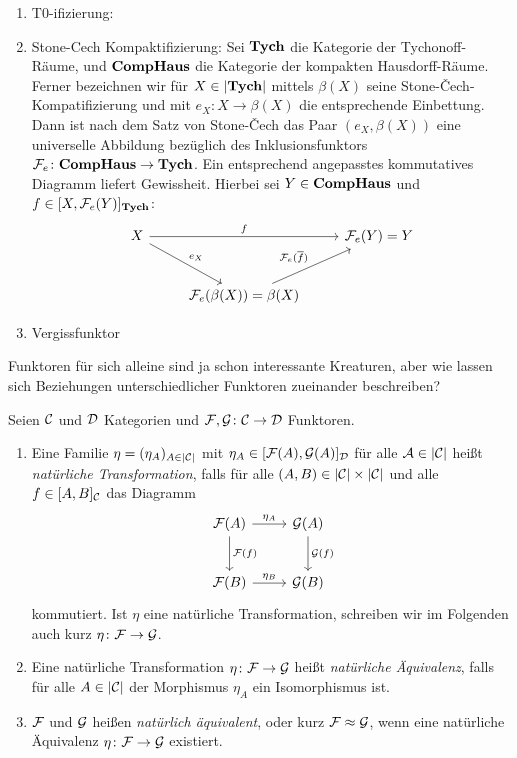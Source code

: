 \begin{ex}
  \begin{enumerate}
    \item T0-ifizierung: 
    \item Stone-Cech Kompaktifizierung: Sei $\mathbf{Tych}$ die Kategorie der Tychonoff-Räume, und $\mathbf{CompHaus}$ die Kategorie der kompakten Hausdorff-Räume.
      Ferner bezeichnen wir für $X \in |\mathbf{Tych}|$ mittels $\beta(X)$ seine Stone-\v{C}ech-Kompatifizierung und mit $e_X \colon X \to \beta(X)$ die entsprechende Einbettung. Dann ist nach dem Satz von Stone-\v{C}ech \cite[5.4.8]{bartsch} das Paar $(e_X, \beta(X))$ eine universelle Abbildung bezüglich des Inklusionsfunktors $\mathcal{F}_e \colon \mathbf{CompHaus} \to \mathbf{Tych}$.
      Ein entsprechend angepasstes kommutatives Diagramm liefert Gewissheit. Hierbei sei $Y \in \mathbf{CompHaus}$ und $f \in [X, \mathcal{F}_e(Y)]_{\mathbf{Tych}}$:
      $$
      \begin{tikzcd}[row sep=2.5em]
        X \arrow[rd,"e_X"] \arrow[rr, "f"] &&\F_e(Y) = Y \\
        &\F_e(\beta(X)) = \beta(X) \arrow[ru, "\F_e(\overline{f})"]
      \end{tikzcd}
      $$
    \item Vergissfunktor
  \end{enumerate}
\end{ex}

Funktoren für sich alleine sind ja schon interessante Kreaturen, aber wie lassen sich Beziehungen unterschiedlicher Funktoren zueinander beschreiben?

\begin{defn}
  Seien $\mathcal{C}$ und $\mathcal{D}$ Kategorien und $\mathcal{F}, \mathcal{G} \colon \mathcal{C} \to \mathcal{D}$ Funktoren.
  \begin{enumerate}[1)]
    \item Eine Familie $\eta = (\eta_A)_{A \in |\mathcal{C}|}$ mit $\eta_A \in [\mathcal{F}(A), \mathcal{G}(A)]_{\mathcal{D}}$ für alle $\mathcal{A} \in |\mathcal{C}|$ heißt \emph{natürliche Transformation}, falls für alle $(A,B) \in |\mathcal{C}| \times |\mathcal{C}|$ und alle $f \in [A,B]_{\mathcal{C}}$ das Diagramm
      $$
      \begin{tikzcd}[row sep=2.5em]
        \F(A)\arrow[r,"\eta_A"]\arrow[d,"\F(f)"] & \G(A)\arrow[d,"\G(f)"] \\
        \F(B)\arrow[r,"\eta_B"] & \G(B)
      \end{tikzcd}
      $$
      kommutiert. Ist $\eta$ eine natürliche Transformation, schreiben wir im Folgenden auch kurz $\eta \colon \mathcal{F} \to \mathcal{G}$.
    \item Eine natürliche Transformation $\eta \colon \mathcal{F} \to \mathcal{G}$ heißt \emph{natürliche Äquivalenz}, falls für alle $A \in |\mathcal{C}|$ der Morphismus $\eta_A$ ein Isomorphismus ist.
    \item $\mathcal{F}$ und $\mathcal{G}$ heißen \emph{natürlich äquivalent}, oder kurz $\mathcal{F} \approx \mathcal{G}$, wenn eine natürliche Äquivalenz $\eta \colon \mathcal{F} \to \mathcal{G}$ existiert.
  \end{enumerate}
\end{defn}

